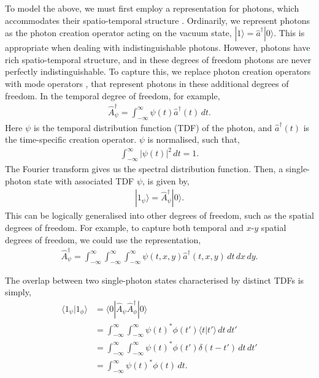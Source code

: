 \documentclass[aps,rmp,twocolumn,amsmath,amssymb,nofootinbib,superscriptaddress]{revtex4}
\newcommand{\bra}[1]{\langle#1|}
\newcommand{\ket}[1]{|#1\rangle}
\begin{document}
To model the above, we must first employ a representation for photons, which accommodates their spatio-temporal structure \cite{bib:RohdeRalph05}. Ordinarily, we represent photons as the photon creation operator acting on the vacuum state, \mbox{$\ket{1}=\hat{a}^\dag\ket{0}$}. This is appropriate when dealing with indistinguishable photons. However, photons have rich spatio-temporal structure, and in these degrees of freedom photons are never perfectly indistinguishable. To capture this, we replace photon creation operators with mode operators \cite{bib:RohdeMauererSilberhorn07}, that represent photons in these additional degrees of freedom. In the temporal degree of freedom, for example,
\begin{align}
\hat{A}^\dag_\psi = \int_{-\infty}^\infty \psi(t) \hat{a}^\dag(t) \,dt.
\end{align}
Here $\psi$ is the temporal distribution function (TDF) of the photon, and $\hat{a}^\dag(t)$ is the time-specific creation operator. $\psi$ is normalised, such that,
\begin{align}
\int_{-\infty}^\infty |\psi(t)|^2 \, dt = 1.
\end{align}
The Fourier transform gives us the spectral distribution function. Then, a single-photon state with associated TDF $\psi$, is given by,
\begin{align}
\ket{1_\psi} = \hat{A}^\dag_\psi \ket{0}.
\end{align}
This can be logically generalised into other degrees of freedom, such as the spatial degrees of freedom. For example, to capture both temporal and $x$-$y$ spatial degrees of freedom, we could use the representation,
\begin{align}
\hat{A}^\dag_\psi = \int_{-\infty}^\infty \int_{-\infty}^\infty \int_{-\infty}^\infty \psi(t,x,y) \hat{a}^\dag(t,x,y) \, dt\, dx\, dy.
\end{align}

The overlap between two single-photon states characterised by distinct TDFs is simply,
\begin{align}
\langle 1_\psi | 1_\phi \rangle &= \bra{0} \hat{A}_{\psi} \hat{A}^\dag_{\phi} \ket{0} \nonumber \\
&= \int_{-\infty}^\infty \int_{-\infty}^\infty \psi(t)^*\phi(t') \langle t|t'\rangle \, dt \, dt' \nonumber \\
&= \int_{-\infty}^\infty \int_{-\infty}^\infty \psi(t)^*\phi(t') \delta(t-t')\,dt \, dt' \nonumber \\
&= \int_{-\infty}^\infty \psi(t)^*\phi(t) \,dt.
\end{align}
\end{document}
